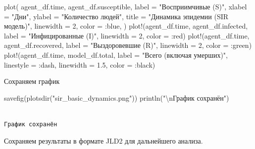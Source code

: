 \documentclass[
  12pt,
  a4paper,
  DIV=11,
  numbers=noendperiod]{scrreprt}
\newenvironment{Shaded}{\begin{snugshade}}{\end{snugshade}}
\newcommand{\FloatTok}[1]{\textcolor[rgb]{0.68,0.00,0.00}{#1}}
\newcommand{\FunctionTok}[1]{\textcolor[rgb]{0.28,0.35,0.67}{#1}}
\newcommand{\NormalTok}[1]{\textcolor[rgb]{0.00,0.23,0.31}{#1}}
\newcommand{\OperatorTok}[1]{\textcolor[rgb]{0.37,0.37,0.37}{#1}}
\newcommand{\SpecialCharTok}[1]{\textcolor[rgb]{0.37,0.37,0.37}{#1}}
\newcommand{\StringTok}[1]{\textcolor[rgb]{0.13,0.47,0.30}{#1}}
\begin{document}
\begin{Shaded}
\begin{Highlighting}[]
\FunctionTok{plot}\NormalTok{(}
\NormalTok{    agent\_df.time,}
\NormalTok{    agent\_df.susceptible,}
\NormalTok{    label }\OperatorTok{=} \StringTok{"Восприимчивые (S)"}\NormalTok{,}
\NormalTok{    xlabel }\OperatorTok{=} \StringTok{"Дни"}\NormalTok{,}
\NormalTok{    ylabel }\OperatorTok{=} \StringTok{"Количество людей"}\NormalTok{,}
\NormalTok{    title }\OperatorTok{=} \StringTok{"Динамика эпидемии (SIR модель)"}\NormalTok{,}
\NormalTok{    linewidth }\OperatorTok{=} \FloatTok{2}\NormalTok{,}
\NormalTok{    color }\OperatorTok{=} \OperatorTok{:}\NormalTok{blue,}
\NormalTok{)}
\FunctionTok{plot!}\NormalTok{(agent\_df.time, agent\_df.infected, label }\OperatorTok{=} \StringTok{"Инфицированные (I)"}\NormalTok{, linewidth }\OperatorTok{=} \FloatTok{2}\NormalTok{, color }\OperatorTok{=} \OperatorTok{:}\NormalTok{red)}
\FunctionTok{plot!}\NormalTok{(agent\_df.time, agent\_df.recovered, label }\OperatorTok{=} \StringTok{"Выздоровевшие (R)"}\NormalTok{, linewidth }\OperatorTok{=} \FloatTok{2}\NormalTok{, color }\OperatorTok{=} \OperatorTok{:}\NormalTok{green)}
\FunctionTok{plot!}\NormalTok{(agent\_df.time, model\_df.total, label }\OperatorTok{=} \StringTok{"Всего (включая умерших)"}\NormalTok{, linestyle }\OperatorTok{=} \OperatorTok{:}\NormalTok{dash, linewidth }\OperatorTok{=} \FloatTok{1.5}\NormalTok{, color }\OperatorTok{=} \OperatorTok{:}\NormalTok{black)}
\end{Highlighting}
\end{Shaded}



Сохраняем график

\begin{Shaded}
\begin{Highlighting}[]
\FunctionTok{savefig}\NormalTok{(}\FunctionTok{plotsdir}\NormalTok{(}\StringTok{"sir\_basic\_dynamics.png"}\NormalTok{))}
\FunctionTok{println}\NormalTok{(}\StringTok{"}\SpecialCharTok{\textbackslash{}n}\StringTok{График сохранён"}\NormalTok{)}
\end{Highlighting}
\end{Shaded}

\begin{verbatim}

График сохранён
\end{verbatim}

Сохраняем результаты в формате JLD2 для дальнейшего анализа.
\end{document}
